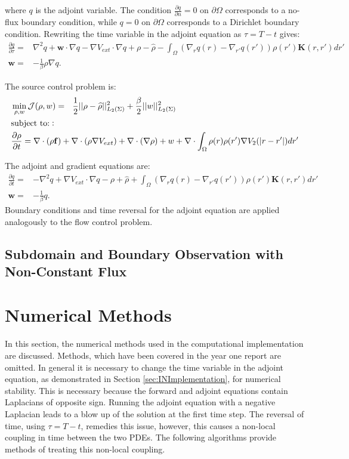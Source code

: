 \documentclass[11pt, a4paper]{article}
\theoremstyle{definition}
\newcommand{\Sta}{\rho}
\newcommand{\Adjb}{q}
\newcommand{\Con}{\mathbf{f}}
\begin{document}
where $\Adjb$ is the adjoint variable. The condition $\frac{\partial \Adjb}{\partial n} = 0$ on $\partial \Omega$ corresponds to a no-flux boundary condition, while $\Adjb = 0$ on $\partial \Omega$ corresponds to a Dirichlet boundary condition.
Rewriting the time variable in the adjoint equation as $\tau = T-t$ gives:
\begin{align*}
\frac{\partial \Adjb}{\partial \tau} =& \nabla^2\Adjb +\mathbf{w} \cdot \nabla \Adjb - \nabla V_{ext} \cdot \nabla \Adjb + \Sta - \widehat \rho -\int_\Omega (\nabla_r \Adjb(r) - \nabla_{r'} \Adjb(r') ) \rho(r') \mathbf{K}(r,r') dr'\\
\mathbf{w} =& - \frac{1}{\beta} \Sta \nabla \Adjb.
\end{align*}

The source control problem is:
\begin{align}
\label{eqn:AdvDiffLinear}
&\min_{\Sta,{w} } \mathcal J(\Sta,{w}) = \ \ \frac{1}{2}||\Sta - \widehat \Sta||_{L_2(\Sigma)}^2  +\frac{\beta}{2}||{w}||_{L_2(\Sigma)}^2\\
& \text{subject to:}: \notag \\
&\frac{\partial \Sta}{\partial  t} = \nabla \cdot (\Sta\Con) + \nabla \cdot (\rho\nabla V_{ext}) + \nabla \cdot (\nabla \rho) + w \notag +\nabla \cdot \int_\Omega \Sta(r)\Sta(r') \nabla V_2(|r-r'|)dr' \notag
\end{align}

The adjoint and gradient equations are:
\begin{align*}
\frac{\partial \Adjb}{\partial t} =& - \nabla^2 \Adjb + \nabla V_{ext} \cdot \nabla \Adjb - \Sta + \widehat \rho +\int_\Omega (\nabla_r \Adjb(r) - \nabla_{r'} \Adjb(r') ) \rho(r') \mathbf{K}(r,r') dr'\\
\mathbf{w} =& - \frac{1}{\beta} \Adjb.
\end{align*}
Boundary conditions and time reversal for the adjoint equation are applied analogously to the flow control problem.

\subsection{Subdomain and Boundary Observation with Non-Constant Flux}


\section{Numerical Methods} \label{sec:NumericalMethods}
In this section, the numerical methods used in the computational implementation are discussed. Methods, which have been covered in the year one report are omitted.
In general it is necessary to change the time variable in the adjoint equation, as demonstrated in Section \ref{sec:INImplementation}, for numerical stability. This is necessary because the forward and adjoint equations contain Laplacians of opposite sign. Running the adjoint equation with a negative Laplacian leads to a blow up of the solution at the first time step. The reversal of time, using $\tau = T-t$, remedies this issue, however, this causes a non-local coupling in time between the two PDEs.
The following algorithms provide methods of treating this non-local coupling.
\end{document}
